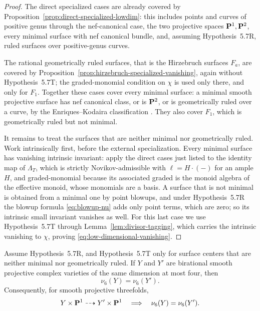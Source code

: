 \begin{proof}
The direct specialized cases are already covered by
Proposition~\ref{prop:direct-specialized-lowdim}: this includes points and
curves of positive genus through the nef-canonical case, the two projective
spaces \(\mathbf P^1,\mathbf P^2\), every minimal surface with nef canonical bundle,
and, assuming Hypothesis~5.7R, ruled surfaces over positive-genus curves.

The rational geometrically ruled surfaces, that is the Hirzebruch surfaces
\(F_a\), are covered by Proposition~\ref{prop:hirzebruch-specialized-vanishing},
again without Hypothesis~5.7T; the graded-monomial condition on \(\chi\) is used
only there, and only for \(F_1\).  Together these cases cover every minimal
surface: a minimal smooth projective surface has nef canonical class, or is
\(\mathbf P^2\), or is geometrically ruled over a curve, by the Enriques--Kodaira
classification \cite[Chapter~VI]{BeauvilleSurfaces}.  They also cover \(F_1\),
which is geometrically ruled but not minimal.

It remains to treat the surfaces that are neither minimal nor geometrically
ruled.  Work intrinsically first, before the external specialization.  Every
minimal surface has vanishing intrinsic invariant: apply the direct cases just
listed to the identity map of \(\Lambda_T\), which is strictly
Novikov-admissible with \(\ell=H\cdot(-)\) for an ample \(H\), and
graded-monomial because its associated graded is the monoid algebra of the
effective monoid, whose monomials are a basis.  A surface that is not minimal
is obtained from a minimal one
by point blowups, and under Hypothesis~5.7R the blowup formula
\eqref{eq:blowup-nu} adds only point terms, which are zero; so its intrinsic
small invariant vanishes as well.  For this last case we use Hypothesis~5.7T
through Lemma~\ref{lem:divisor-tagging}, which carries the intrinsic vanishing
to \(\chi\), proving \eqref{eq:low-dimensional-vanishing}.
\end{proof}

\begin{theorem}
\label{thm:nu6-birational-invariance}
%
%
Assume Hypothesis~5.7R, and Hypothesis~5.7T only for surface centers that are
neither minimal nor geometrically ruled.
If \(Y\) and \(Y'\) are birational smooth projective complex varieties of
the same dimension at most four, then
\[
 \nu_6(Y)=\nu_6(Y').
 \label{eq:nu-birational-invariance}
\]
Consequently, for smooth projective threefolds,
\[
 Y\times\mathbf P^1\dashrightarrow Y'\times\mathbf P^1
 \quad\Longrightarrow\quad \nu_6(Y)=\nu_6(Y').
\]
\end{theorem}

